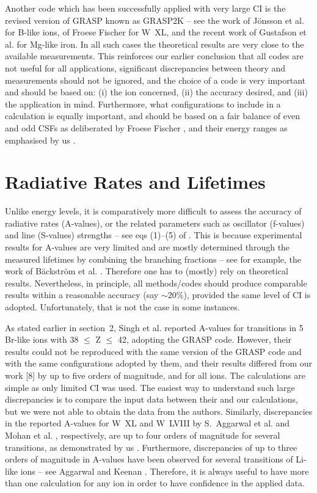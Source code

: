 \documentclass[fleqn]{article}
\begin{document}
 Another code which has been successfully applied with very large CI is the revised version of GRASP known as GRASP2K \cite{grasp2k, grasp2kk} -- see the work of J\"{o}nsson et al. \cite{blike1} for B-like ions,  of Froese Fischer \cite{cffw40} for W~XL, and the recent work of Gustafson et al. \cite{gustaf} for Mg-like iron. In all such cases the theoretical results are very close to the available measurements. This reinforces our earlier conclusion \cite{fst} that all codes are not useful for all applications, significant discrepancies between theory and measurements should not be ignored,  and  the choice of a code  is very important and should be based on: (i) the  ion concerned, (ii) the accuracy desired, and (iii) the application in mind. Furthermore, what configurations to include in a calculation  is equally important, and should be based on a fair balance of even and odd CSFs as deliberated by Froese Fischer \cite{cffw40}, and their energy ranges as emphasised by us \cite{w40a, w58a}.


\section{Radiative Rates and Lifetimes}

Unlike energy levels, it is comparatively more difficult to assess the accuracy of radiative rates (A-values), or the related parameters such as oscillator (f-values) and line (S-values) strengths -- see eqs (1)--(5) of \cite{ti19}. This is because experimental results for A-values are  very limited and are mostly determined through the measured lifetimes by combining the branching fractions -- see for example, the work of B\"{a}ckstr\"{o}m et al. \cite{back}. Therefore one has to (mostly)  rely on theoretical results. Nevertheless, in principle, all methods/codes should produce comparable results within a reasonable accuracy (say $\sim$20\%), provided the same level of CI is adopted. Unfortunately, that is not the case in some instances.

As stated earlier in section~2, Singh et al. \cite{mmbr} reported A-values for transitions in 5 Br-like ions with 38 $\le$ Z $\le$ 42,  adopting the GRASP code. However, their results could not be reproduced with the same version of the GRASP code and with the same configurations adopted by them, and their results differed from our work [8] by up to five orders of magnitude, and for all ions. The calculations are simple as only limited CI was used. The easiest way to understand such large discrepancies is to compare the input data between their  and our calculations, but we were not able to obtain the data from the authors.
Similarly, discrepancies in the reported A-values for W~XL and W~LVIII by S.~Aggarwal et al. \cite{mmw40} and Mohan et al. \cite{mmw58}, respectively, are up to four orders of magnitude for several transitions, as demonstrated by us \cite{w40a, w58a}. Furthermore,  discrepancies of  up to three orders of magnitude in A-values have been observed for several  transitions of Li-like ions  -- see Aggarwal and Keenan \cite{lilikea}. Therefore, it is always useful  to have more than one calculation for any ion in order to have confidence in the applied data.
\end{document}
